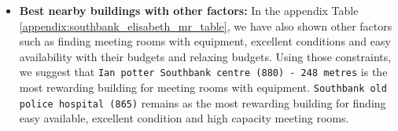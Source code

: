 \begin{itemize}

\item \textbf{Best nearby buildings with other factors:} In the appendix Table \ref{appendix:southbank_elisabeth_mr_table}, we have also shown other factors such as finding meeting rooms with equipment, excellent conditions and easy availability with their budgets and relaxing budgets. Using those constraints, we suggest that \texttt{Ian potter Southbank centre (880) - 248 metres} is the most rewarding building for meeting rooms with equipment. \texttt{Southbank old police hospital (865)} remains as the most rewarding building for finding easy available, excellent condition and high capacity meeting rooms.

\end{itemize}






